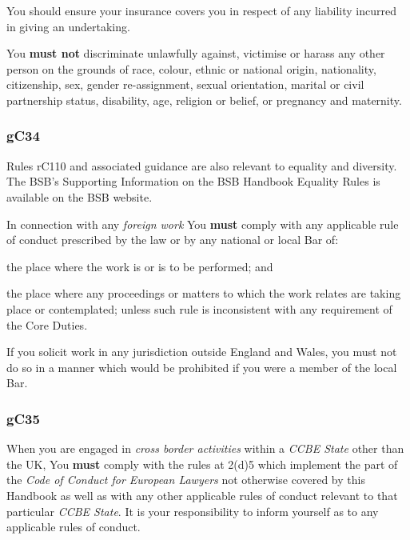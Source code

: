 You should ensure your insurance covers you in respect of any liability
incurred in giving an undertaking.




You \textcolor{myred}{\textbf{must not}} discriminate unlawfully against, victimise or harass any
other person on the grounds of race, colour, ethnic or national origin,
nationality, citizenship, sex, gender re-assignment, sexual orientation,
marital or civil partnership status, disability, age, religion or
belief, or pregnancy and maternity.




\subsubsection{\color{darkgrey}gC34}

Rules rC110 and associated guidance are also relevant to equality and
diversity. The BSB's Supporting Information on the BSB Handbook Equality
Rules is available on the BSB website.




In connection with any \emph{foreign work} You \textcolor{myred}{\textbf{must}} comply with any
applicable rule of conduct prescribed by the law or by any national or
local Bar of:
\begin{numlist}\item the place where the work is or is to be performed; and
\item the place where any proceedings or matters to which the work relates
are taking place or contemplated; unless such rule is inconsistent with
any requirement of the Core Duties.
\end{numlist}

If you solicit work in any jurisdiction outside England and Wales, you
must not do so in a manner which would be prohibited if you were a
member of the local Bar.




\subsubsection{\color{darkgrey}gC35}

When you are engaged in \emph{cross border activities} within a
\emph{CCBE State} other than the UK, You \textcolor{myred}{\textbf{must}} comply with the rules at
2(d)5 which implement the part of the \emph{Code of Conduct for European
Lawyers} not otherwise covered by this Handbook as well as with any
other applicable rules of conduct relevant to that particular \emph{CCBE
State}. It is your responsibility to inform yourself as to any
applicable rules of conduct.

